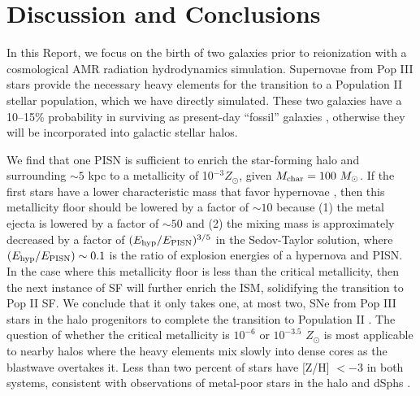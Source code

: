 \documentclass[12pt]{article}
\newcommand{\Ms}{\ifmmode{M_\odot}\else{$M_\odot$}\fi}
\newcommand\tento[1]{$10^{#1}$}
\begin{document}
\section*{Discussion and Conclusions}

In this Report, we focus on the birth of two galaxies prior to
reionization with a cosmological AMR radiation hydrodynamics
simulation.  Supernovae from Pop III stars provide the necessary heavy
elements for the transition to a Population II stellar population,
which we have directly simulated.  These two galaxies have a 10--15\%
probability in surviving as present-day ``fossil'' galaxies
\cite{Gnedin06}, otherwise they will be incorporated into galactic
stellar halos.  

We find that one PISN is sufficient to enrich the star-forming halo
and surrounding $\sim 5$ kpc to a metallicity of 10$^{-3} Z_\odot$,
given $M_{\rm char} = 100~\Ms$.  If the first stars have a lower
characteristic mass that favor hypernovae \cite{Tumlinson07_IMF}, then
this metallicity floor should be lowered by a factor of $\sim 10$
because (1) the metal ejecta is lowered by a factor of $\sim 50$ and
(2) the mixing mass is approximately decreased by a factor of $(E_{\rm
  hyp}/E_{\rm PISN})^{3/5}$ in the Sedov-Taylor solution, where
$(E_{\rm hyp}/E_{\rm PISN}) \sim 0.1$ is the ratio of explosion
energies of a hypernova and PISN.  In the case where this metallicity
floor is less than the critical metallicity, then the next instance of
SF will further enrich the ISM, solidifying the transition to Pop II
SF.  We conclude that it only takes one, at most two, SNe from Pop III
stars in the halo progenitors to complete the transition to Population
II \cite{Frebel10}.  The question of whether the critical metallicity
is \tento{-6} or \tento{-3.5} $Z_\odot$ is most applicable to nearby
halos where the heavy elements mix slowly into dense cores as the
blastwave overtakes it.  Less than two percent of stars have [Z/H] $<
-3$ in both systems, consistent with observations of metal-poor stars
in the halo and dSphs \cite{Beers05, Battaglia10}.
\end{document}
